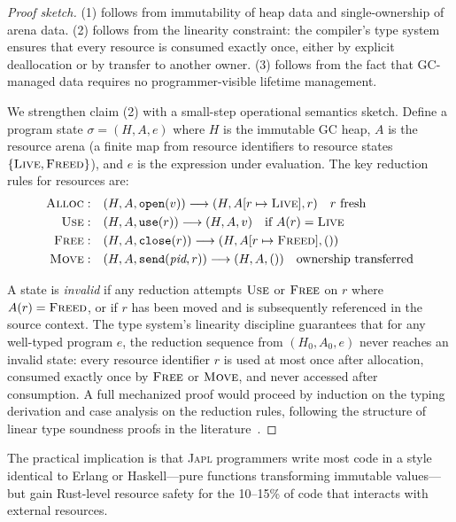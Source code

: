 \documentclass[11pt,twocolumn]{article}
\newcommand{\japl}{\textsc{Japl}}
\begin{document}
\begin{proof}[Proof sketch]
(1) follows from immutability of heap data and single-ownership of arena data.
(2) follows from the linearity constraint: the compiler's type system ensures that every resource is consumed exactly once, either by explicit deallocation or by transfer to another owner.
(3) follows from the fact that GC-managed data requires no programmer-visible lifetime management.

We strengthen claim (2) with a small-step operational semantics sketch.
Define a program state $\sigma = (H, A, e)$ where $H$ is the immutable GC heap, $A$ is the resource arena (a finite map from resource identifiers to resource states $\{\textsc{Live}, \textsc{Freed}\}$), and $e$ is the expression under evaluation.
The key reduction rules for resources are:
\begin{align*}
\textsc{Alloc}:& \quad (H, A, \texttt{open}(v)) \longrightarrow (H, A[r \mapsto \textsc{Live}], r) \quad r \text{ fresh} \\
\textsc{Use}:& \quad (H, A, \texttt{use}(r)) \longrightarrow (H, A, v) \quad \text{if } A(r) = \textsc{Live} \\
\textsc{Free}:& \quad (H, A, \texttt{close}(r)) \longrightarrow (H, A[r \mapsto \textsc{Freed}], ()) \\
\textsc{Move}:& \quad (H, A, \texttt{send}(\textit{pid}, r)) \longrightarrow (H, A, ()) \quad \text{ownership transferred}
\end{align*}

A state is \emph{invalid} if any reduction attempts $\textsc{Use}$ or $\textsc{Free}$ on $r$ where $A(r) = \textsc{Freed}$, or if $r$ has been moved and is subsequently referenced in the source context.
The type system's linearity discipline guarantees that for any well-typed program $e$, the reduction sequence from $(H_0, A_0, e)$ never reaches an invalid state: every resource identifier $r$ is used at most once after allocation, consumed exactly once by $\textsc{Free}$ or $\textsc{Move}$, and never accessed after consumption.
A full mechanized proof would proceed by induction on the typing derivation and case analysis on the reduction rules, following the structure of linear type soundness proofs in the literature~\citep{pierce2002types}.
\end{proof}

The practical implication is that \japl{} programmers write most code in a style identical to Erlang or Haskell---pure functions transforming immutable values---but gain Rust-level resource safety for the 10--15\% of code that interacts with external resources.
\end{document}
